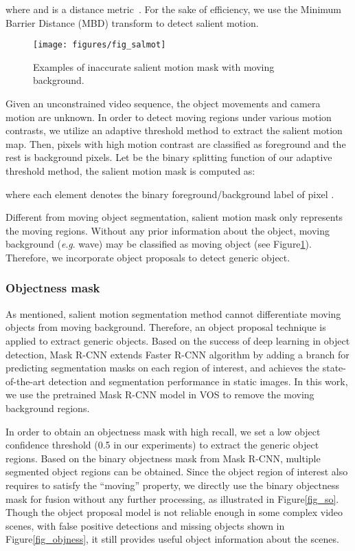 \documentclass[journal]{IEEEtran}
\makeatletter
\newcommand{\eg}{\textit{e}.\textit{g}. }
\newcommand{\fig}{{Figure}\@\xspace}
\makeatother
\begin{document}
where {\small } and {\small } is a distance metric~\cite{TPAMI2011_Cheng}.
For the sake of efficiency, we use the Minimum Barrier Distance (MBD) transform \cite{ICCV2015_Zhang} to detect salient motion.

\begin{figure}[!t]
	\centerline{\texttt{[image: figures/fig\_salmot]}}
	\caption{Examples of inaccurate salient motion mask with moving background.}
	\label{fig_salmot}
\end{figure} 
Given an unconstrained video sequence,
the object movements and camera motion are unknown.
In order to detect moving regions under various motion contrasts,
we utilize an adaptive threshold method \cite{TSMC1979_Otsu} to extract the salient motion map.
Then, pixels with high motion contrast are classified as foreground and the rest is background pixels. 
Let  be the binary splitting function of our adaptive threshold method,
the salient motion mask {\small } is computed as: 

where each element {\small } denotes the binary foreground/background label of pixel {\small }.

Different from moving object segmentation, salient motion mask only represents the moving regions.
Without any prior information about the object, moving background (\eg wave) may be classified as moving object (see \fig \ref{fig_salmot}).
Therefore, we incorporate object proposals to detect generic object.

\subsubsection{Objectness mask}  
As mentioned, salient motion segmentation method cannot differentiate moving objects from moving background.
Therefore, an object proposal technique is applied to extract generic objects. 
Based on the success of deep learning in object detection,
Mask R-CNN \cite{ICCV2017_He} extends Faster R-CNN algorithm \cite{NIPS2015_Ren} by adding a branch for predicting segmentation masks on each region of interest, 
and achieves the state-of-the-art detection and segmentation performance in static images. 
In this work, we use the pretrained Mask R-CNN \cite{ICCV2017_He} model in VOS to remove the moving background regions. 

In order to obtain an objectness mask {\small } with high recall,
we set a low object confidence threshold (0.5 in our experiments) to extract the generic object regions.
Based on the binary objectness mask from Mask R-CNN, multiple segmented object regions can be obtained. 
Since the object region of interest also requires to satisfy the ``moving'' property, 
we directly use the binary objectness mask for fusion without any further processing, as illustrated in \fig \ref{fig_so}.
Though the object proposal model is not reliable enough in some complex video scenes, 
with false positive detections and missing objects shown in \fig \ref{fig_objness},
it still provides useful object information about the scenes.
\end{document}
